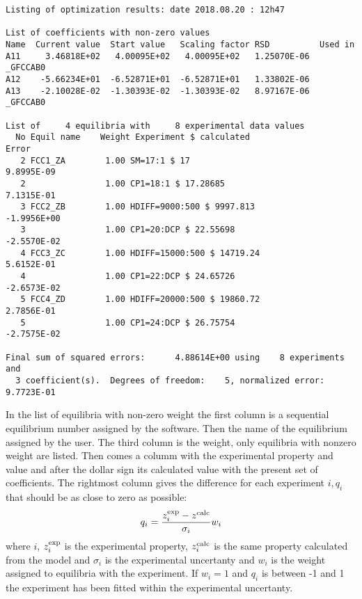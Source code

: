 \documentclass[11pt]{article}
\begin{document}
\begin{verbatim}
Listing of optimization results: date 2018.08.20 : 12h47

List of coefficients with non-zero values
Name  Current value  Start value   Scaling factor RSD          Used in
A11     3.46818E+02   4.00095E+02   4.00095E+02   1.25070E-06  _GFCCAB0
A12    -5.66234E+01  -6.52871E+01  -6.52871E+01   1.33802E-06
A13    -2.10028E-02  -1.30393E-02  -1.30393E-02   8.97167E-06  _GFCCAB0

List of     4 equilibria with     8 experimental data values
  No Equil name    Weight Experiment $ calculated                   Error
   2 FCC1_ZA        1.00 SM=17:1 $ 17                               9.8995E-09
   2                1.00 CP1=18:1 $ 17.28685                        7.1315E-01
   3 FCC2_ZB        1.00 HDIFF=9000:500 $ 9997.813                 -1.9956E+00
   3                1.00 CP1=20:DCP $ 22.55698                     -2.5570E-02
   4 FCC3_ZC        1.00 HDIFF=15000:500 $ 14719.24                 5.6152E-01
   4                1.00 CP1=22:DCP $ 24.65726                     -2.6573E-02
   5 FCC4_ZD        1.00 HDIFF=20000:500 $ 19860.72                 2.7856E-01
   5                1.00 CP1=24:DCP $ 26.75754                     -2.7575E-02

Final sum of squared errors:      4.88614E+00 using    8 experiments and
  3 coefficient(s).  Degrees of freedom:    5, normalized error:    9.7723E-01
\end{verbatim}

In the list of equilibria with non-zero weight the first column is a
sequential equilibrium number assigned by the software.  Then the name
of the equilibrium assigned by the user. The third column is the
weight, only equilibria with nonzero weight are listed.  Then comes a
columm with the experimental property and value and after the dollar
sign its calculated value with the present set of coefficients.  The
rightmost column gives the difference for each experiment $i, q_i$
that should be as close to zero as possible:
\begin{equation}
q_i = \frac{z^{\rm exp}_i - z^{\rm calc}}{\sigma_i} w_i
\end{equation}
where $i$, $z_i^{\rm exp}$ is the experimental property, $z_i^{\rm
  calc}$ is the same property calculated from the model and $\sigma_i$
is the experimental uncertanty and $w_i$ is the weight assigned to
equilibria with the experiment.  If $w_i = 1$ and $q_i$ is between -1
and 1 the experiment has been fitted within the experimental
uncertanty.
\end{document}
